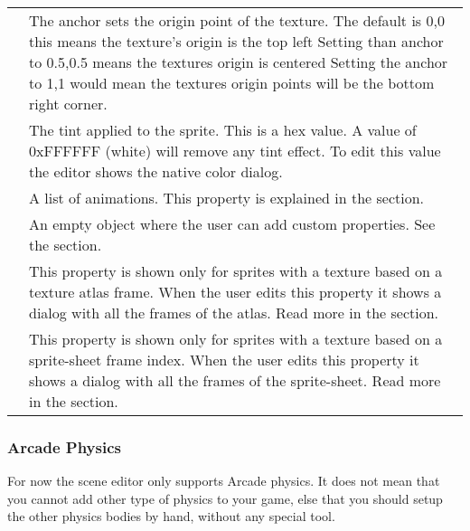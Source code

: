 \documentclass[letterpaper,10pt,english]{sphinxmanual}
\begin{document}
\begin{savenotes}\sphinxattablestart
\centering
\begin{tabulary}{\linewidth}[t]{|T|T|}
\hline
{}\relax &\relax \\
\hline
{}
&
The anchor sets the origin point of the texture. The default is 0,0 this means the texture’s origin is the top left Setting than anchor to 0.5,0.5 means the textures origin is centered Setting the anchor to 1,1 would mean the textures origin points will be the bottom right corner.
\\
\hline
{}
&
The tint applied to the sprite. This is a hex value. A value of 0xFFFFFF (white) will remove any tint effect. To edit this value the editor shows the native color dialog.
\\
\hline
{}
&
A list of animations. This property is explained in the {\hyperref[\detokenize{canvas:animations}]{}} section.
\\
\hline
{}
&
An empty object where the user can add custom properties. See the {\hyperref[\detokenize{canvas:user-data}]{}} section.
\\
\hline
{}
&
This property is shown only for sprites with a texture based on a texture atlas frame. When the user edits this property it shows a dialog with all the frames of the atlas. Read more in the {\hyperref[\detokenize{canvas:texture}]{}} section.
\\
\hline
{}
&
This property is shown only for sprites with a texture based on a sprite-sheet frame index. When the user edits this property it shows a dialog with all the frames of the sprite-sheet. Read more in the {\hyperref[\detokenize{canvas:texture}]{}} section.
\\
\hline
\end{tabulary}
\par
\sphinxattableend\end{savenotes}


\subsubsection{Arcade Physics}
\label{\detokenize{canvas:arcade-physics}}
For now the scene editor only supports Arcade physics. It does not mean that you cannot add other type of physics to your game, else that you should setup the other physics bodies by hand, without any special tool.
\end{document}
